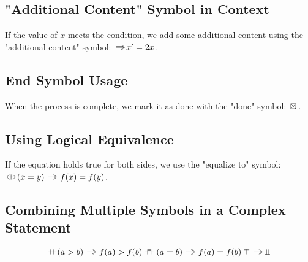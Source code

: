 \documentclass{iac}
\begin{document}
\subsection{"Additional Content" Symbol in Context}

If the value of $x$ meets the condition, we add some additional content using the "additional content" symbol: 
$\additionalcontent  x' = 2x$.

\subsection{End Symbol Usage}

When the process is complete, we mark it as done with the "done" symbol: 
$\doneL$.

\subsection{Using Logical Equivalence}

If the equation holds true for both sides, we use the "equalize to" symbol: 
$\logicalEquL (x = y) \toL f(x) = f(y)$.

\subsection{Combining Multiple Symbols in a Complex Statement}

$$
    \ifL (a > b) \toL f(a) > f(b)  
    \elifL (a = b) \toL f(a) = f(b)  
    \elseL \toL \undefinedL
$$
\end{document}
